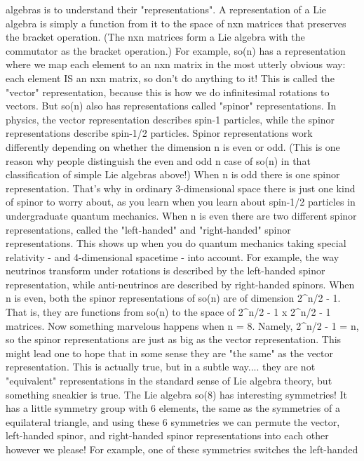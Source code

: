 algebras is to understand their "representations".  A representation
of a Lie algebra is simply a function from it to the space of nxn
matrices that preserves the bracket operation.  (The nxn matrices form
a Lie algebra with the commutator as the bracket operation.)  For
example, so(n) has a representation where we map each element to an
nxn matrix in the most utterly obvious way: each element IS an nxn
matrix, so don't do anything to it!  This is called the "vector"
representation, because this is how we do infinitesimal rotations to
vectors.  But so(n) also has representations called "spinor"
representations.  In physics, the vector representation describes
spin-1 particles, while the spinor representations describe spin-1/2 
particles.
Spinor representations work differently depending on whether the
dimension n is even or odd.  (This is one reason why people distinguish
the even and odd n case of so(n) in that classification of simple
Lie algebras above!)  When n is odd there is one spinor representation.  
That's why in ordinary 3-dimensional space there is just one kind of 
spinor to worry about, as you learn when you learn about spin-1/2 particles
in undergraduate quantum mechanics.  When n is even there are two different 
spinor representations, called the "left-handed" and "right-handed" 
spinor representations.  This shows up when you do quantum mechanics taking
special relativity - and 4-dimensional spacetime - into account.  For
example, the way neutrinos transform under rotations is described by
the left-handed spinor representation, while anti-neutrinos are described
by right-handed spinors. 
When n is even, both the spinor representations of so(n) are of 
dimension 2^{n/2 - 1}.  That is, they are functions from so(n) to the space of 
2^{n/2 - 1} x 2^{n/2 - 1} matrices.  Now something marvelous happens when 
n = 8.  Namely, 2^{n/2 - 1} = n, so the spinor representations are 
just as big as the vector representation.  This might lead one to hope 
that in some sense they are "the same" as the vector representation.  
This is actually true, but in a subtle way.... they are not "equivalent" 
representations in the standard sense of Lie algebra theory, but something 
sneakier is true.  
The Lie algebra so(8) has interesting symmetries!  It has a little 
symmetry group with 6 elements, the same as the symmetries of a
equilateral triangle, and using these 6 symmetries we can permute the 
vector, left-handed spinor, and right-handed spinor representations 
into each other however we please!  
For example, one of these symmetries switches the left-handed
